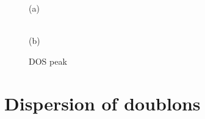 \begin{figure}[h!]
\begin{minipage}[h]{0.5\linewidth}
 (a) \\
\end{minipage}
\hfill
\begin{minipage}[h]{0.5\linewidth}
 \\(b)
\end{minipage}
\caption{DOS peak}
\label{fig:DOS_peak}
\end{figure}





\FloatBarrier
\section{Dispersion of doublons}



